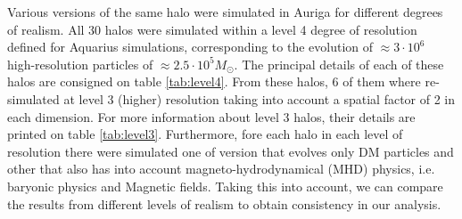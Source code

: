 Various versions of the same halo were simulated in Auriga for different degrees of realism. All 30 halos were simulated within a level 4 degree of resolution defined for Aquarius simulations, corresponding to the evolution of $\approx 3\cdot 10^6$ high-resolution particles of $\approx 2.5 \cdot 10^5 M_\odot$. The principal details of each of these halos are consigned on table \ref{tab:level4}. From these halos, 6 of them where re-simulated at level 3 (higher) resolution taking into account a spatial factor of 2 in each dimension. For more information about level 3 halos, their details are printed on table \ref{tab:level3}. Furthermore, fore each halo in each level of resolution there were simulated one of version that evolves only DM particles and other that also has into account magneto-hydrodynamical (MHD) physics, i.e. baryonic physics and Magnetic fields. Taking this into account, we can compare the results from different levels of realism to obtain consistency in our analysis.\\

